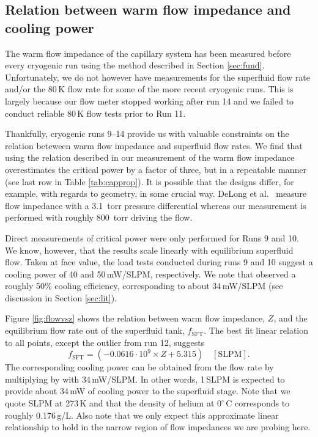 \documentclass[
12pt, %
letterpaper, %
oneside, %
headinclude, footinclude, %
BCOR5mm, %
]{scrartcl}
\newcommand{\mrm}[1]{\mathrm{#1}}
\begin{document}
\subsection{Relation between warm flow impedance and cooling power}

The warm flow impedance of the capillary system has been measured before every cryogenic run using the method described in Section \ref{sec:fund}. Unfortunately, we do not however have measurements for the superfluid flow rate and/or the 80\,K flow rate for some of the more recent cryogenic runs. This is largely because our flow meter stopped working after run 14 and we failed to conduct reliable 80\,K flow tests prior to Run 11.

Thankfully, cryogenic runs 9--14 provide us with valuable constraints on the relation beteween warm flow impedance and superfluid flow rates. We find that using the relation described in \cite{Delong1970} our measurement of the warm flow impedance overestimates the critical power by a factor of three, but in a repeatable manner (see last row in Table \ref{tab:capprop}). It is possible that the designs differ, for example, with regards to geometry, in some crucial way. DeLong et al.\ \cite{Delong1970} measure flow impedance with a 3.1~torr pressure differential whereas our measurement is performed with roughly 800~torr driving the flow. 

Direct measurements of critical power were only performed for Runs 9 and 10. We know, however, that the results scale linearly with equilibrium superfluid flow. Taken at face value, the load tests conducted during runs 9 and 10 suggest a cooling power of 40 and 50\,mW/SLPM, respectively. We note that \cite{Delong1970} observed a roughly 50\% cooling efficiency, corresponding to about 34\,mW/SLPM (see discussion in Section \ref{sec:lit}).

Figure \ref{fig:flowvsz} shows the relation between warm flow impedance, $Z$, and the equilibrium flow rate out of the superfluid tank, $f_\mrm{SFT}$. The best fit linear relation to all points, except the outlier from run 12, suggests 
\begin{equation}
f_\mrm{SFT} = (-0.0616 \cdot 10^{9} \times Z + 5.315) \quad [\mrm{SLPM}].
\end{equation}
The corresponding cooling power can be obtained from the flow rate by multiplying by with 34\,mW/SLPM. In other words, 1\,SLPM is expected to provide about 34\,mW of cooling power to the superfluid stage. Note that we quote SLPM at 273\,K and that the density of helium at $0^{\circ}$\,C corresponds to roughly 0.176\,g/L. Also note that we only expect this approximate linear relationship to hold in the narrow region of flow impedances we are probing here.
\end{document}
